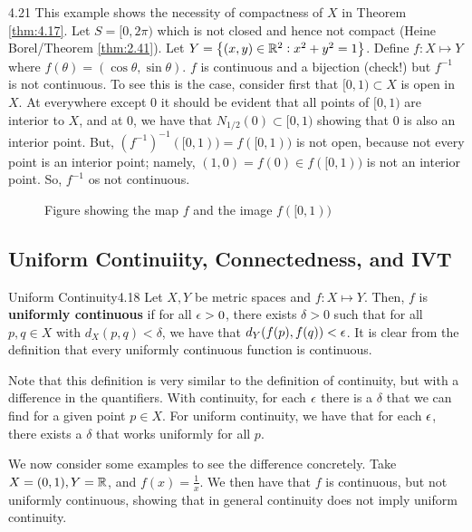 \setcounter{rudin}{20}
\begin{example}{}{4.21}
    This example shows the necessity of compactness of $X$ in Theorem \ref{thm:4.17}. Let $S = [0, 2\pi)$ which is not closed and hence not compact (Heine Borel/Theorem \ref{thm:2.41}). Let $Y = \set{(x, y) \in \mathbb{R}^2: x^2 + y^2 = 1}$. Define $f: X \mapsto Y$ where $f(\theta) = (\cos\theta, \sin\theta)$. $f$ is continuous and a bijection (check!) but $f^{-1}$ is not continuous. To see this is the case, consider first that $[0, 1) \subset X$ is open in $X$. At everywhere except $0$ it should be evident that all points of $[0, 1)$ are interior to $X$, and at $0$, we have that $N_{1/2}(0) \subset [0, 1)$ showing that $0$ is also an interior point. But, $(f^{-1})^{-1}([0, 1)) = f([0, 1))$ is not open, because not every point is an interior point; namely, $(1, 0) = f(0) \in f([0, 1))$ is not an interior point. So, $f^{-1}$ os not continuous.
\end{example}

\begin{figure}[htbp]
    \centering
    
    \caption{Figure showing the map $f$ and the image $f([0,1))$}
    \label{fig19}
\end{figure}

\subsection{Uniform Continuiity, Connectedness, and IVT}

\setcounter{rudin}{17}
\begin{definition}{Uniform Continuity}{4.18}
    Let $X, Y$ be metric spaces and $f: X \mapsto Y$. Then, $f$ is \textbf{uniformly continuous} if for all $\epsilon > 0$, there exists $\delta > 0$ such that for all $p, q \in X$ with $d_X(p, q) < \delta$, we have that $d_Y(f(p), f(q)) < \epsilon$. It is clear from the definition that every uniformly continuous function is continuous.
\end{definition}
\noindent Note that this definition is very similar to the definition of continuity, but with a difference in the quantifiers. With continuity, for each $\epsilon$ there is a $\delta$ that we can find for a given point $p \in X$. For uniform continuity, we have that for each $\epsilon$, there exists a $\delta$ that works uniformly for all $p$. 

We now consider some examples to see the difference concretely. Take $X = (0, 1), Y = \mathbb{R}$, and $f(x) = \frac{1}{x}$. We then have that $f$ is continuous, but not uniformly continuous, showing that in general continuity does not imply uniform continuity.

